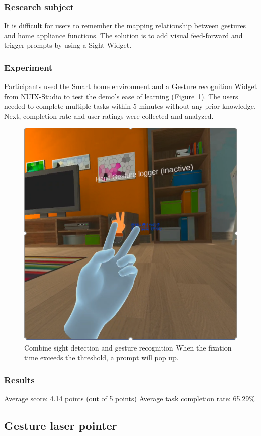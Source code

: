 \subsubsection{Research subject}

It is difficult for users to remember the mapping relationship between gestures and home appliance functions.
The solution is to add visual feed-forward and trigger prompts by using a Sight Widget.

\subsubsection{Experiment}

Participants used the Smart home environment and a Gesture recognition Widget from NUIX-Studio to test the demo's ease of learning (Figure~\ref{fig:Project7-figure}). The users needed to complete multiple tasks within 5 minutes without any prior knowledge.
Next, completion rate and user ratings were collected and analyzed.

\begin{figure}
  \centering
  \includegraphics[width=0.6\linewidth]{figures/Project_7.png}
  \caption{Combine sight detection and gesture recognition
When the fixation time exceeds the threshold, a prompt will pop up.}
  \label{fig:Project7-figure}
\end{figure}

\subsubsection{Results}

Average score: 4.14 points (out of 5 points)
Average task completion rate: 65.29\%

\subsection{Gesture laser pointer}

